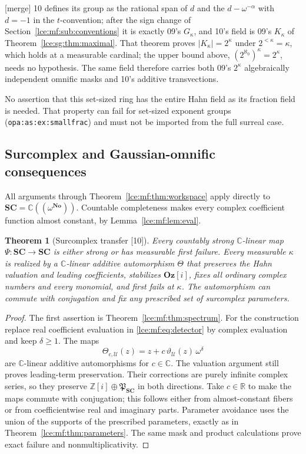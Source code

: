 \documentclass[11pt,letterpaper]{article}
\numberwithin{equation}{section}
\newtheorem{theorem}{Theorem}[section]
\theoremstyle{definition}
\theoremstyle{remark}
\newcommand{\No}{\mathbf{No}}
\newcommand{\Oz}{\mathbf{Oz}}
\newcommand{\SC}{\mathbf{SC}}
\newcommand{\R}{\mathbb R}
\newcommand{\C}{\mathbb C}
\newcommand{\Z}{\mathbb Z}
\newcommand{\abs}[1]{\lvert#1\rvert}
\newcommand{\thref}[1]{Theorem~\ref{#1}}
\newcommand{\leref}[1]{Lemma~\ref{#1}}
\newcommand{\src}[1]{\textup{\textsf{\small[#1]}}}%
\newcommand{\mergetag}{\textup{\textsf{\small[merge]}}}%
\newcommand{\lbl}[1]{\nolinkurl{#1}}%
\newcommand{\HF}[2]{#1((\omega^{#2}))}
\begin{document}
\mergetag{} 10 defines its group as the rational span of $d$ and the
$d-\omega^{-\alpha}$ with $d=-1$ in the $t$-convention; after the sign
change of Section~\ref{lce:mf:sub:conventions} it is exactly 09's
$G_\kappa$, and 10's field is 09's $K_\kappa$ of
\thref{lce:sg:thm:maximal}. That theorem proves $\abs{K_\kappa}=2^\kappa$
under $2^{<\kappa}=\kappa$, which holds at a measurable cardinal; the upper
bound above, $(2^{\aleph_0})^\kappa=2^\kappa$, needs no hypothesis. The same
field therefore carries both 09's $2^\kappa$ algebraically independent
omnific masks and 10's additive transvections.

No assertion that this set-sized ring has the entire Hahn field as its
fraction field is needed. That property can fail for set-sized exponent
groups (\lbl{opa:as:ex:smallfrac}) and must not be imported from the full
surreal case.

\subsection{Surcomplex and Gaussian-omnific consequences}
All arguments through \thref{lce:mf:thm:workspace} apply directly to
$\SC=\HF\C\No$. Countable completeness makes every complex coefficient
function almost constant, by \leref{lce:mf:lem:eval}.

\begin{theorem}[Surcomplex transfer \src{10}]\label{lce:mf:thm:complex}
Every countably strong $\C$-linear map $\Psi:\SC\to\SC$ is either strong or
has measurable first failure. Every measurable $\kappa$ is realized by a
$\C$-linear additive automorphism $\Theta$ that preserves the Hahn valuation
and leading coefficients, stabilizes $\Oz[i]$, fixes all ordinary complex
numbers and every monomial, and first fails at $\kappa$. The automorphism
can commute with conjugation and fix any prescribed set of surcomplex
parameters.
\end{theorem}
\begin{proof}
The first assertion is \thref{lce:mf:thm:spectrum}. For the construction
replace real coefficient evaluation in \eqref{lce:mf:eq:detector} by complex
evaluation and keep $\delta\ge1$. The maps
\[
 \Theta_{c,\mathcal U}(z)=z+c\,\vartheta_{\mathcal U}(z)\,\omega^\delta
\]
are $\C$-linear additive automorphisms for $c\in\C$. The valuation argument
still proves leading-term preservation. Their corrections are purely
infinite complex series, so they preserve $\Z[i]\oplus\mathfrak P_{\SC}$ in
both directions. Take $c\in\R$ to make the maps commute with conjugation;
this follows either from almost-constant fibers or from coefficientwise real
and imaginary parts. Parameter avoidance uses the union of the supports of
the prescribed parameters, exactly as in \thref{lce:mf:thm:parameters}. The
same mask and product calculations prove exact failure and
nonmultiplicativity.
\end{proof}
\end{document}
